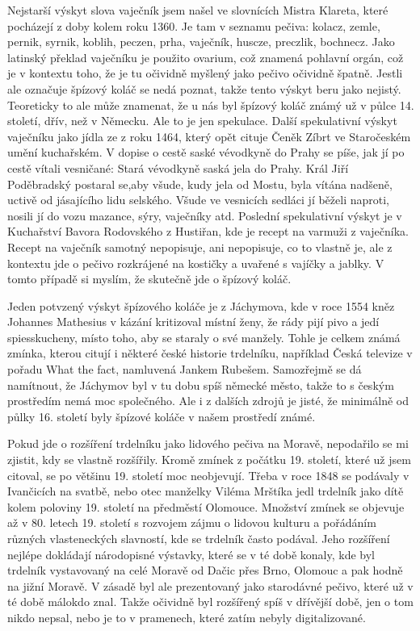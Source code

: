 Nejstarší výskyt slova vaječník jsem našel ve slovnících Mistra Klareta, které pocházejí z doby kolem roku 1360. Je tam v seznamu pečiva: kolacz, zemle, pernik, syrnik, koblih, peczen, prha, vaječník, huscze, preczlik, bochnecz. Jako latinský překlad vaječníku je použito ovarium, což znamená pohlavní orgán, což je v kontextu toho, že je tu očividně myšlený jako pečivo očividně špatně. Jestli ale označuje špízový koláč se nedá poznat, takže tento výskyt beru jako nejistý. Teoreticky to ale může znamenat, že u nás byl špízový koláč známý už v půlce 14. století, dřív, než v Německu. Ale to je jen spekulace. Další spekulativní výskyt vaječníku jako jídla ze z roku 1464, který opět cituje Čeněk Zíbrt ve Staročeském umění kuchařském. V dopise o cestě saské vévodkyně do Prahy se píše, jak jí po cestě vítali vesničané: Stará vévodkyně saská jela do Prahy. Král Jiří Poděbradský postaral se,aby všude, kudy jela od Mostu, byla vítána nadšeně, uctivě od jásajícího lidu selského. Všude ve vesnicích sedláci jí běželi naproti, nosili jí do vozu mazance, sýry, vaječníky atd. Poslední spekulativní výskyt je v Kuchařství Bavora Rodovského z Hustiřan, kde je recept na varmuži z vaječníka. Recept na vaječník samotný nepopisuje, ani nepopisuje, co to vlastně je, ale z kontextu jde o pečivo rozkrájené na kostičky a uvařené s vajíčky a jablky. V tomto případě si myslím, že skutečně jde o špízový koláč. 

Jeden potvzený výskyt špízového koláče je z Jáchymova, kde v roce 1554 kněz Johannes Mathesius v kázání kritizoval místní ženy, že rády pijí pivo a jedí spiesskucheny, místo toho, aby se staraly o své manžely. Tohle je celkem známá zmínka, kterou citují i některé české historie trdelníku, například Česká televize v pořadu What the fact, namluvená Jankem Rubešem. Samozřejmě se dá namítnout, že Jáchymov byl v tu dobu spíš německé město, takže to s českým prostředím nemá moc společného. Ale i z dalších zdrojů je jisté, že minimálně od půlky 16. století byly špízové koláče v našem prostředí známé.

Pokud jde o rozšíření trdelníku jako lidového pečiva na Moravě,  nepodařilo se mi  zjistit, kdy se vlastně rozšířily. Kromě zmínek z počátku 19. století, které už jsem citoval, se po většinu 19. století moc neobjevují. Třeba v roce 1848 se podávaly v Ivančicích na svatbě, nebo otec manželky Viléma Mrštíka jedl trdelník jako dítě kolem poloviny 19. století na předměstí Olomouce. Množství zmínek se objevuje až v 80. letech 19. století s rozvojem zájmu o lidovou kulturu a pořádáním různých vlasteneckých slavností, kde se trdelník často podával. Jeho rozšíření nejlépe dokládají národopisné výstavky, které se v té době konaly, kde byl trdelník vystavovaný na celé Moravě od Dačic přes Brno, Olomouc a pak hodně na jižní Moravě. V zásadě byl ale prezentovaný jako starodávné pečivo, které už v té době málokdo znal. Takže očividně byl rozšířený spíš v dřívější době, jen o tom nikdo nepsal, nebo je to v pramenech, které zatím nebyly digitalizované. 

